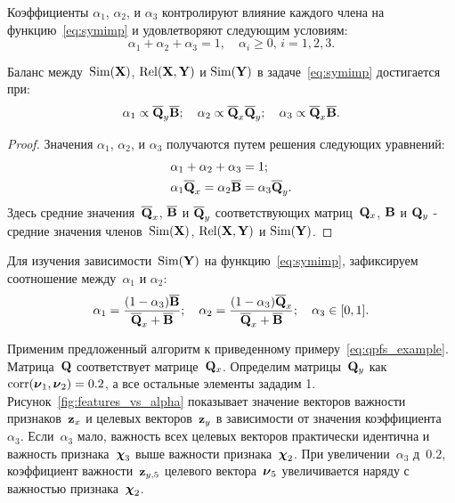 Коэффициенты $\alpha_1$, $\alpha_2$, и $\alpha_3$ контролируют влияние каждого члена на функцию~\eqref{eq:symimp} и удовлетворяют следующим условиям:
\begin{equation*}
\alpha_1 + \alpha_2 + \alpha_3 = 1, \quad \alpha_i \geq 0, \, i = 1, 2, 3.
\end{equation*}
\begin{statement}
	Баланс между~$\text{Sim}(\mathbf{X})$, $\text{Rel}(\mathbf{X}, \mathbf{Y})$ и $\text{Sim}(\mathbf{Y})$ в  задаче~\eqref{eq:symimp} достигается при:
	\begin{equation}
	\alpha_1 \propto \overline{\mathbf{Q}}_y \overline{\mathbf{B}} ; \quad
	\alpha_2 \propto \overline{\mathbf{Q}}_x \overline{\mathbf{Q}}_y; \quad
	\alpha_3  \propto \overline{\mathbf{Q}}_x \overline{\mathbf{B}}.
	\label{eq:alpha_3}
	\end{equation}
	
\end{statement}
\begin{proof}
	Значения $\alpha_1$, $\alpha_2$, и $\alpha_3$ получаются путем решения следующих уравнений:
	\begin{align*}
	&\alpha_1 + \alpha_2 + \alpha_3 = 1; \\
	&\alpha_1 \overline{\mathbf{Q}}_x = \alpha_2 \overline{\mathbf{B}} = \alpha_3 \overline{\mathbf{Q}}_y.
	\end{align*}
	Здесь средние значения~$\overline{\mathbf{Q}}_x$, $\overline{\mathbf{B}}$ и $\overline{\mathbf{Q}}_y$ соответствующих матриц~$\mathbf{Q}_x$, $\mathbf{B}$ и $\mathbf{Q}_y$ - средние значения членов~$\text{Sim}(\mathbf{X})$, $\text{Rel}(\mathbf{X}, \mathbf{Y})$ и $\text{Sim}(\mathbf{Y})$.
\end{proof}
Для изучения зависимости~$\text{Sim}(\mathbf{Y})$ на функцию~\eqref{eq:symimp}, зафиксируем соотношение между~$\alpha_1$ и $\alpha_2$:
\begin{equation}
\alpha_1 = \frac{(1 - \alpha_3)\overline{\mathbf{B}}}{\overline{\mathbf{Q}}_x + \overline{\mathbf{B}}}; \quad
\alpha_2 = \frac{(1 - \alpha_3)\overline{\mathbf{Q}}_x}{\overline{\mathbf{Q}}_x + \overline{\mathbf{B}}}; \quad
\alpha_3 \in [0, 1].
\label{eq:alphas3}
\end{equation}

Применим предложенный алгоритм к приведенному примеру~\eqref{eq:qpfs_example}.
Матрица~$\mathbf{Q}$ соответствует матрице~$\mathbf{Q}_x$.
Определим матрицы~$\mathbf{Q}_y$ как $\text{corr}(\boldsymbol{\nu}_1, \boldsymbol{\nu}_2) = 0.2$, а все остальные элементы зададим 1.
Рисунок~\ref{fig:features_vs_alpha} показывает значение векторов важности признаков~$\mathbf{z}_x$ и целевых векторов~$\mathbf{z}_y$ в зависимости от значения коэффициента~$\alpha_3$.
Если~$\alpha_3$ мало, важность всех целевых векторов практически идентична и важность признака~$\boldsymbol{\chi}_3$ выше важности признака~$\boldsymbol{\chi}_2$. При увеличении~$\alpha_3$ д~$0.2$, коэффициент важности~$\mathbf{z}_{y,5}$ целевого вектора~$\boldsymbol{\nu}_5$ увеличивается наряду с важностью признака~$\boldsymbol{\chi}_2$.

